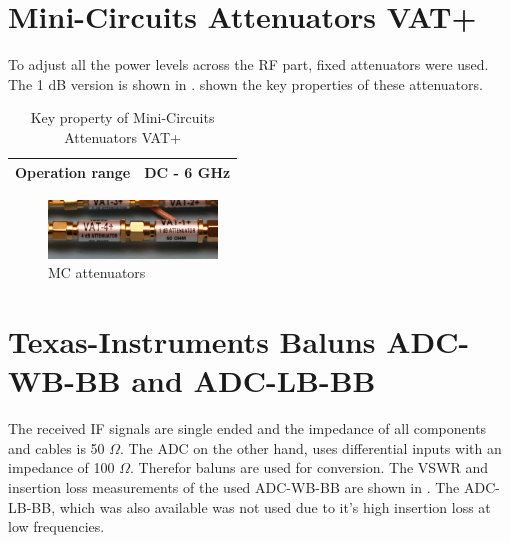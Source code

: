 \section{Mini-Circuits Attenuators VAT+}
\label{sec:comp_vat}
To adjust all the power levels across the \gls{RF} part, fixed
attenuators were used. The 1 dB version is shown in
.  shown the key properties
of these attenuators.

\begin{table}[h]
  \centering
  \begin{tabular}{|l|l|}
    \hline
    Operation range & DC - 6 GHz \\ \hline
  \end{tabular}
  \caption{Key property of Mini-Circuits Attenuators VAT+ \cite{mc_vat1}}
  \label{tab:comp_vat}
\end{table}

\begin{figure}[p]
  \centering
  \includegraphics[width=0.4\textwidth]{pictures/attenuator}
  \caption{\gls{MC} attenuators}
  \label{fig:comp_vat_pic}
\end{figure}

\section{Texas-Instruments Baluns ADC-WB-BB and ADC-LB-BB}
\label{sec:comp_balun}
The received \gls{IF} signals are single ended and the impedance of all
components and cables is 50 $\Omega$. The \gls{ADC} on the other hand, uses
differential inputs with an impedance of 100 $\Omega$. Therefor baluns are used
for conversion. The \gls{VSWR} and insertion loss measurements of the used
ADC-WB-BB are shown in . The ADC-LB-BB, which was also
available was not used due to it's high insertion loss at low frequencies. \\


